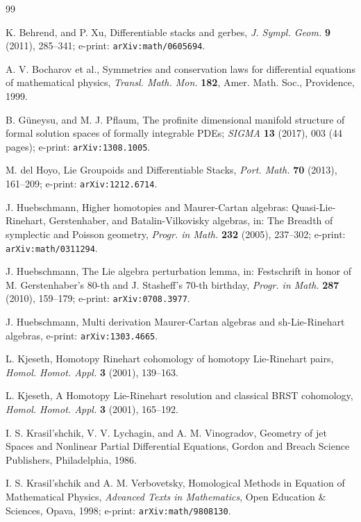 \documentclass{conm-p-l}
\theoremstyle{definition}
\theoremstyle{remark}
\numberwithin{equation}{section}
\begin{document}
\begin{thebibliography}{99}      

 K.{} Behrend, and P.{} Xu, Differentiable stacks and gerbes, \emph{J. Sympl. Geom. }\textbf{9} (2011), 285--341; e-print: \texttt{arXiv:math/0605694}.                                                                                         

A.{} V.{} Bocharov et al., Symmetries and conservation laws for
differential equations of mathematical physics, \emph{Transl.{} Math.{} Mon.{}
}\textbf{182}, Amer.{} Math.{} Soc., Providence, 1999.

B.{} G\"uneysu, and M.{} J.{} Pflaum, The profinite dimensional manifold structure of formal solution spaces of formally integrable PDEs; \emph{SIGMA} \textbf{13} (2017), 003 (44 pages); e-print: \texttt{arXiv:1308.1005}.

M.{} del Hoyo, Lie Groupoids and Differentiable Stacks, \emph{Port.{} Math.{} }\textbf{70} (2013), 161--209; e-print: \texttt{arXiv:1212.6714}.

J.{} Huebschmann, Higher homotopies and Maurer-Cartan algebras: Quasi-Lie-Rinehart, Gerstenhaber, and Batalin-Vilkovisky algebras, in: The Breadth of symplectic and Poisson geometry, \emph{Progr.{} in Math.{}} \textbf{232} (2005), 237--302; e-print: \texttt{arXiv:math/0311294}.

J.{} Huebschmann, The Lie algebra perturbation lemma, in:
Festschrift in honor of M.{} Gerstenhaber's 80-th and J.{} Stasheff's 70-th
birthday, \emph{Progr.{} in Math.} \textbf{287} (2010), 159--179; e-print:
 \texttt{arXiv:0708.3977}.

J.{} Huebschmann, Multi derivation Maurer-Cartan algebras and
sh-Lie-Rinehart algebras, e-print: \texttt{arXiv:1303.4665}.

L.{} Kjeseth, Homotopy Rinehart cohomology of homotopy
Lie-Rinehart pairs, \emph{Homol.{} Homot.{} Appl.{} }\textbf{3} (2001), 139--163.

L.{} Kjeseth, A Homotopy Lie-Rinehart resolution and classical
BRST cohomology, \emph{Homol.{} Homot.{} Appl.{} }\textbf{3} (2001), 165--192.

 I.{} S.{} Krasil'shchik, V.{} V.{} Lychagin, and A.{} M.{} Vinogradov,  Geometry of jet Spaces and Nonlinear Partial Differential Equations, Gordon and Breach Science Publishers, Philadelphia, 1986.

I.{} S.{} Krasil'shchik and A.{} M.{} Verbovetsky, Homological Methods in Equation of Mathematical Physics, \emph{Advanced Texts in Mathematics}, Open Education \& Sciences, Opava, 1998; e-print: \texttt{arXiv:math/9808130}.


\end{thebibliography}
\end{document}
